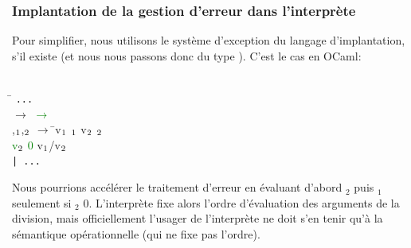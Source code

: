 %
\begin{frame}
\frametitle{Implantation de la gestion d'erreur dans l'interprète}

Pour simplifier, nous utilisons le système d'exception du langage
d'implantation, s'il existe (et nous nous passons donc du type
). C'est le cas en OCaml:
{\small
\begin{tabbing}
\Xexception {} \Xof {}\semi\\
\Xlet \= \Xrec {}   \equal \Xmatch
{} \Xwith \texttt{...} \\
\vbar \>   \(\rightarrow\) \textcolor{green}{\Xbegin
  \Xtry}   \textcolor{green}{\Xwith {}
  \(\rightarrow\)  \lpar{}\lpar{}
  \rpar\rpar{} \Xend}\\
\vbar \> 
\lpar\textbf{},\(\sb{1}\),\(\sb{2}\)\rpar{}
\(\rightarrow\) \= \Xlet v\(\sb{1}\) \equal {}
\(\sb{1}\) \Xand v\(\sb{2}\) \equal {}
\(\sb{2}\)\\
\> \> \Xin \textcolor{green}{\Xif v\(\sb{2}\) \equal \num{0} \Xthen
{} \lpar{}\lpar{}\rpar\rpar{}
\Xelse} v\(\sb{1}\)\textsf{/}v\(\sb{2}\) \\
\texttt{| ...}
\end{tabbing}
}
\remarque Nous pourrions accélérer le traitement d'erreur en
évaluant d'abord $_2$ puis $_1$ seulement si $_2$
\nequal \num{0}. L'interprète fixe alors l'ordre d'évaluation des
arguments de la division, mais officiellement l'usager de l'interprète
ne doit s'en tenir qu'à la sémantique opérationnelle (qui ne fixe pas
l'ordre).

\end{frame}

